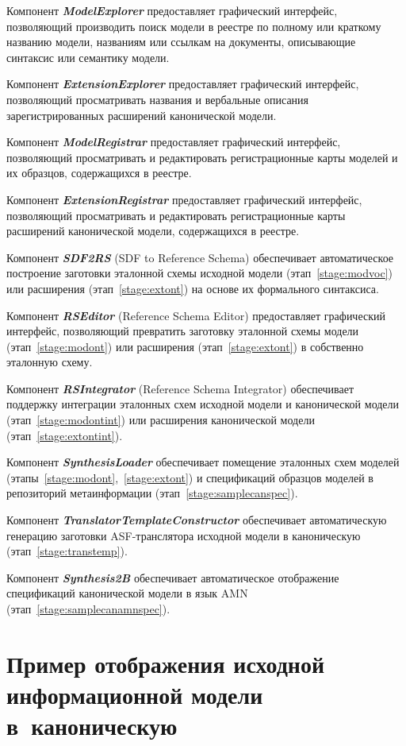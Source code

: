 \begin{multicols}{2}
Компонент {\bfseries\textit{ModelExplorer}} предоставляет графический
интерфейс, позволяющий производить поиск модели в реестре
по полному или краткому названию модели, названиям или ссылкам
на документы, описывающие синтаксис или семантику модели.

Компонент {\bfseries\textit{ExtensionExplorer}} предоставляет графический
интерфейс, позволяющий просматривать названия и вербальные описания
зарегистрированных расширений канонической модели.

Компонент {\bfseries\textit{ModelRegistrar}} предоставляет графический
интерфейс, позволяющий просматривать и редактировать регистрационные карты
моделей и их образцов, содержащихся в реестре.

Компонент {\bfseries\textit{ExtensionRegistrar}} предоставляет графический
интерфейс, позволяющий просматривать и редактировать регистрационные карты
расширений канонической модели, содержащихся в реестре.

Компонент {\bfseries\textit{SDF2RS}} (SDF to Reference Schema)
обеспечивает автоматическое построение заготовки эталонной схемы исходной
модели (этап~\ref{stage:modvoc}) или расширения (этап~\ref{stage:extont})
на основе их формального синтаксиса.

Компонент {\bfseries\textit{RSEditor}} (Reference Schema Editor)
предоставляет графический интерфейс, позво\-ля\-ющий превратить заготовку
эталонной схемы модели (этап~\ref{stage:modont}) или расширения
(этап~\ref{stage:extont}) в собственно эталонную схему.

Компонент {\bfseries\textit{RSIntegrator}} (Reference Schema Integrator)
обеспечивает поддержку интеграции эталонных схем исходной модели и
канонической модели (этап~\ref{stage:modontint})
или расширения канонической модели (этап~\ref{stage:extontint}).

Компонент {\bfseries\textit{SynthesisLoader}} обеспечивает помещение
эталонных схем моделей (этапы~\ref{stage:modont},~\ref{stage:extont})
и спецификаций образцов моделей в репозиторий метаинформации
(этап~\ref{stage:samplecanspec}).

Компонент {\bfseries\textit{TranslatorTemplateConstructor}} обеспечивает
автоматическую генерацию заготовки ASF-транслятора
исходной модели в каноническую (этап~\ref{stage:transtemp}).

Компонент {\bfseries\textit{Synthesis2B}} обеспечивает автоматическое отображение
спецификаций канонической модели в язык AMN
(этап~\ref{stage:samplecanamnspec}).

\section{Пример отображения исходной информационной модели в~каноническую}


\end{multicols}

